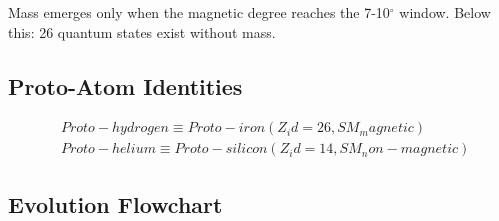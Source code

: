 \documentclass[12pt,a4paper]{article}
\begin{document}
Mass emerges only when the magnetic degree reaches the 7-10$^{\circ}$ window. Below this: 26 quantum states exist without mass.

\subsection{Proto-Atom Identities}

\begin{equation}
\begin{aligned}
  & Proto-hydrogen \equiv Proto-iron (Z_id = 26, SM_magnetic) \\
  & Proto-helium   \equiv Proto-silicon (Z_id = 14, SM_non-magnetic)
\end{aligned}
\end{equation}

\subsection{Evolution Flowchart}
\end{document}
